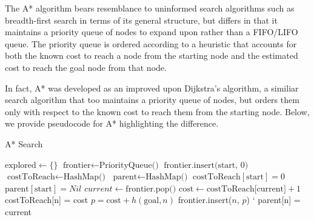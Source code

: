 \documentclass[12pt, conference, compsocconf]{IEEEtran}
\begin{document}
The A* algorithm bears resemblance to uninformed search algorithms such as breadth-first search in terms of its general structure, but differs in that it maintains a priority queue of nodes to expand upon rather than a FIFO/LIFO queue. 
The priority queue is ordered according to a heuristic that accounts for both the known cost to reach a node from the starting node and the estimated cost to reach the goal node from that node. 

In fact, A* was developed as an improved upon Dijkstra's algorithm, a similiar search algorithm that too maintains a priority queue of nodes, but orders them only with respect to the known cost to reach them from the starting node. 
Below, we provide pseudocode for A* highlighting the difference.

\begin{algorithm}
    \caption{A* Search}
    \label{alg-astar}
    \begin{algorithmic}[1]
            \State $\text{explored} \gets \{\}$
            \State $\text{frontier} \gets \text{PriorityQueue()}$
            \State $\text{frontier.insert(start, 0)}$
            \State $\text{costToReach} \gets \text{HashMap()}$
            \State $\text{parent} \gets \text{HashMap()}$
            \State $\text{costToReach}[\text{start}] = 0$
            \State $\text{parent}[\text{start}] = Nil$
                \State $current \gets \text{frontier.pop()}$
                \Else
                        \State $\text{cost} \gets \text{costToReach[current]} + 1$
                                \State costToReach[n] = cost
                                \State $p = \text{cost} + h(\text{goal}, n)$
                                \State frontier.insert($n$, $p$)
            `                   \State parent[n] = current
                            \EndIf
                        \EndFor
                \EndIf
            \EndWhile
        \State {}
        \EndFunction
    \end{algorithmic}
\end{algorithm}
\end{document}
